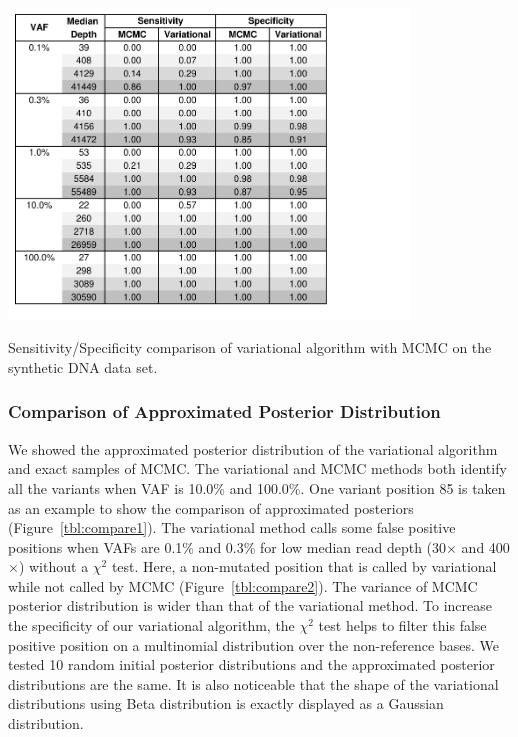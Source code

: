 \documentclass[11pt,reqno]{amsart}
\begin{document}
\begin{table}[h]
\centering
\includegraphics[width=0.8\textwidth]{tables/statistics_mcmc_var.pdf}
\caption{Sensitivity/Specificity comparison of variational algorithm with MCMC on the synthetic DNA data set.}
\label{tbl:statistics_mcmc_var}
\end{table}

\subsubsection{Comparison of Approximated Posterior Distribution}
We showed the approximated posterior distribution of the variational algorithm and exact samples of MCMC.
The variational and MCMC methods both identify all the variants when VAF is 10.0\% and 100.0\%.
One variant position 85 is taken as an example to show the comparison of approximated posteriors (Figure~\ref{tbl:compare1}).
The variational method calls some false positive positions when VAFs are 0.1\% and 0.3\% for low median read depth (30$\times$ and 400$\times$) without a $\chi^2$ test.
Here, a non-mutated position that is called by variational while not called by MCMC (Figure~\ref{tbl:compare2}).
The variance of MCMC posterior distribution is wider than that of the variational method. %
To increase the specificity of our variational algorithm, the $\chi^2$ test helps to filter this false positive position on a multinomial distribution over the non-reference bases.
We tested 10 random initial posterior distributions and the approximated posterior distributions are the same.
It is also noticeable that the shape of the variational distributions using Beta distribution is exactly displayed as a Gaussian distribution.
\end{document}
